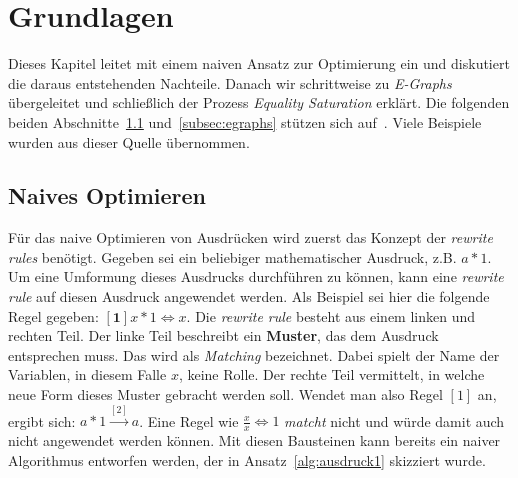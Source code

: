 \section{Grundlagen}\label{sec:grundlagen}


Dieses Kapitel leitet mit einem naiven Ansatz zur Optimierung ein und diskutiert die daraus entstehenden Nachteile.
Danach wir schrittweise zu \textit{E-Graphs}
übergeleitet und schließlich der Prozess \textit{Equality Saturation} erklärt.
Die folgenden beiden Abschnitte~\ref{subsec:naiv} und~\ref{subsec:egraphs} stützen sich auf~\cite{cole}. Viele Beispiele wurden aus dieser Quelle übernommen.

\subsection{Naives Optimieren}\label{subsec:naiv}

Für das naive Optimieren von Ausdrücken wird zuerst das Konzept der \textit{rewrite rules} benötigt. Gegeben sei ein beliebiger mathematischer Ausdruck, z.B.
$a * 1$. Um eine Umformung dieses Ausdrucks durchführen zu können, kann eine \textit{rewrite rule} auf diesen Ausdruck angewendet werden.
Als Beispiel sei hier die folgende Regel gegeben: $[\mathbf{1}] x * 1 \Leftrightarrow x$. Die \textit{rewrite rule} besteht aus einem linken und rechten Teil. Der linke Teil
beschreibt ein \textbf{Muster}, das dem Ausdruck entsprechen muss. Das wird als \textit{Matching} bezeichnet. Dabei spielt der Name der Variablen, in diesem Falle $x$, keine Rolle.
Der rechte Teil vermittelt, in welche neue Form dieses Muster gebracht werden soll. Wendet man also Regel $[1]$ an,
ergibt sich: $a * 1  \overset{[2]}{\rightarrow} a$. 
Eine Regel wie $\frac{x}{x} \Leftrightarrow 1$ \textit{matcht} nicht und würde damit auch nicht angewendet werden können.
Mit diesen Bausteinen kann bereits ein naiver Algorithmus entworfen werden, der in Ansatz~\ref{alg:ausdruck1} skizziert wurde. 


